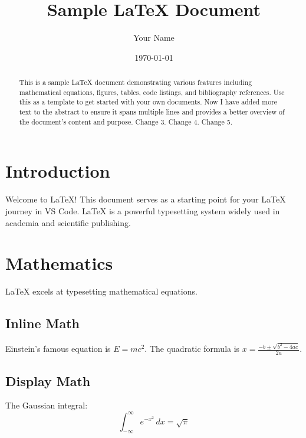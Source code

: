 \documentclass[12pt,a4paper]{article}
\title{Sample \LaTeX{} Document}
\author{Your Name}
\date{\today}
\begin{document}
\maketitle

\begin{abstract}
This is a sample \LaTeX{} document demonstrating various features including mathematical equations, figures, tables, code listings, and bibliography references. Use this as a template to get started with your own documents. Now I have added more text to the abstract to ensure it spans multiple lines and provides a better overview of the document's content and purpose. Change 3. Change 4. Change 5.
\end{abstract}

\tableofcontents
\newpage

\section{Introduction}

Welcome to \LaTeX{}! This document serves as a starting point for your \LaTeX{} journey in VS Code. \LaTeX{} is a powerful typesetting system widely used in academia and scientific publishing.

\lipsum[1]

\section{Mathematics}

\LaTeX{} excels at typesetting mathematical equations.

\subsection{Inline Math}

Einstein's famous equation is $E = mc^2$. The quadratic formula is $x = \frac{-b \pm \sqrt{b^2 - 4ac}}{2a}$.

\subsection{Display Math}

The Gaussian integral:
\begin{equation}
    \int_{-\infty}^{\infty} e^{-x^2} \, dx = \sqrt{\pi}
    \label{eq:gaussian}
\end{equation}
\end{document}
